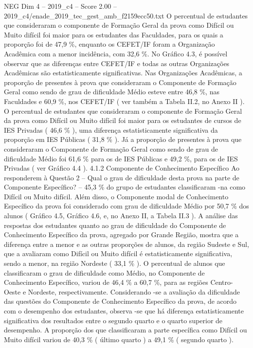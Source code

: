 \begin{textsample}{NEG Dim 4 – 2019\_c4 – Score 2.00 – 2019\_c4/enade\_2019\_tec\_gest\_amb\_f2159ecc50.txt}
O percentual de estudantes que consideraram o componente de Formação Geral da prova como Difícil ou Muito difícil foi maior para os estudantes das Faculdades, para os quais a proporção foi de 47,9 \%, enquanto os CEFET/IF foram a Organização Acadêmica com a menor incidência, com 32,6 \%.
No Gráfico 4.3, é possível observar que as diferenças entre CEFET/IF e todas as outras Organizações Acadêmicas são estatisticamente significativas.
Nas Organizações Acadêmicas, a proporção de presentes à prova que consideraram o Componente de Formação Geral como sendo de grau de dificuldade Médio esteve entre 46,8 \%, nas Faculdades e 60,9 \%, nos CEFET/IF ( ver também a Tabela II.2, no Anexo II ).
O percentual de estudantes que consideraram o componente de Formação Geral da prova como Difícil ou Muito difícil foi maior para os estudantes de cursos de IES Privadas ( 46,6 \% ), uma diferença estatisticamente significativa da proporção em IES Públicas ( 31,8 \% ).
Já a proporção de presentes à prova que consideraram o Componente de Formação Geral como sendo de grau de dificuldade Médio foi 61,6 \% para os de IES Públicas e 49,2 \%, para os de IES Privadas ( ver Gráfico 4.4 ). 4.1.2 Componente de Conhecimento Específico Ao responderem à Questão 2 – Qual o grau de dificuldade desta prova na parte de Componente Específico? – 45,3 \% do grupo de estudantes classificaram -na como Difícil ou Muito difícil.
Além disso, o Componente modal de Conhecimento Específico da prova foi considerado com grau de dificuldade Médio por 50,7 \% dos alunos ( Gráfico 4.5, Gráfico 4.6, e, no Anexo II, a Tabela II.3 ).
A análise das respostas dos estudantes quanto ao grau de dificuldade do Componente de Conhecimento Específico da prova, agregado por Grande Região, mostra que a diferença entre a menor e as outras proporções de alunos, da região Sudeste e Sul, que a avaliaram como Difícil ou Muito difícil é estatisticamente significativa, sendo a menor, na região Nordeste ( 33,1 \% ).
O percentual de alunos que classificaram o grau de dificuldade como Médio, no Componente de Conhecimento Específico, variou de 46,4 \% a 60,7 \%, para as regiões Centro-Oeste e Nordeste, respectivamente.
Considerando -se a avaliação da dificuldade das questões do Componente de Conhecimento Específico da prova, de acordo com o desempenho dos estudantes, observa -se que há diferença estatisticamente significativa dos resultados entre o segundo quarto e o quarto superior de desempenho.
A proporção dos que classificaram a parte específica como Difícil ou Muito difícil variou de 40,3 \% ( último quarto ) a 49,1 \% ( segundo quarto ).

\end{textsample}
